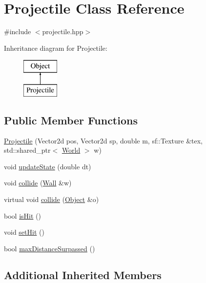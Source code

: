 \hypertarget{classProjectile}{}\section{Projectile Class Reference}
\label{classProjectile}


{\ttfamily \#include $<$projectile.\+hpp$>$}

Inheritance diagram for Projectile\+:\begin{figure}[H]
\begin{center}
\leavevmode
\includegraphics[height=2.000000cm]{classProjectile}
\end{center}
\end{figure}
\subsection*{Public Member Functions}
\begin{DoxyCompactItemize}
\item 
\hyperlink{classProjectile_a2ac17690fe70259fee93ec2d9be115d3}{Projectile} (Vector2d pos, Vector2d sp, double m, sf\+::\+Texture \&tex, std\+::shared\+\_\+ptr$<$ \hyperlink{classWorld}{World} $>$ w)
\item 
void \hyperlink{classProjectile_aa3781e4c9023c6d0306da7239987f9f7}{update\+State} (double dt)
\item 
void \hyperlink{classProjectile_abfd30c4ad89a47b267e269b9b6ab1300}{collide} (\hyperlink{classWall}{Wall} \&w)
\item 
virtual void \hyperlink{classProjectile_a5dbfa02e6e14a2149240762aa1e50403}{collide} (\hyperlink{classObject}{Object} \&o)
\item 
bool \hyperlink{classProjectile_abdb99a309b640e906790d93ad42511a4}{is\+Hit} ()
\item 
void \hyperlink{classProjectile_a6a409515a2e255b25ca80ee031d9a771}{set\+Hit} ()
\item 
bool \hyperlink{classProjectile_a02f748270bc39583e3268a88664f928e}{max\+Distance\+Surpassed} ()
\end{DoxyCompactItemize}
\subsection*{Additional Inherited Members}


